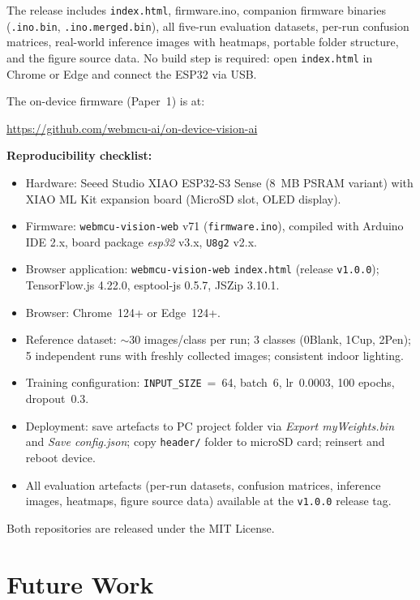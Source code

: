 \documentclass[11pt]{article}
\begin{document}
The release includes \texttt{index.html}, firmware.ino, companion firmware binaries
(\texttt{.ino.bin}, \texttt{.ino.merged.bin}), all five-run evaluation datasets,
per-run confusion matrices, real-world inference images with heatmaps, portable folder structure, and the
figure source data. No build step is required: open \texttt{index.html} in Chrome
or Edge and connect the ESP32 via USB.

The on-device firmware (Paper~1) is at:
\begin{center}
\url{https://github.com/webmcu-ai/on-device-vision-ai}
\end{center}

\textbf{Reproducibility checklist:}
\begin{itemize}
  \item Hardware: Seeed Studio XIAO ESP32-S3 Sense (8~MB PSRAM variant) with XIAO ML Kit
        expansion board (MicroSD slot, OLED display).
  \item Firmware: \texttt{webmcu-vision-web} v71 (\texttt{firmware.ino}), compiled
        with Arduino IDE 2.x, board package \textit{esp32} v3.x, \texttt{U8g2} v2.x.
  \item Browser application: \texttt{webmcu-vision-web} \texttt{index.html} (release \texttt{v1.0.0});
        TensorFlow.js 4.22.0, esptool-js 0.5.7, JSZip 3.10.1.
  \item Browser: Chrome~124+ or Edge~124+.
  \item Reference dataset: $\sim$30 images/class per run; 3 classes (0Blank, 1Cup, 2Pen);
        5 independent runs with freshly collected images; consistent indoor lighting.
  \item Training configuration: \texttt{INPUT\_SIZE}~=~64, batch~6,
        lr~0.0003, 100 epochs, dropout~0.3.
  \item Deployment: save artefacts to PC project folder via \textit{Export myWeights.bin}
        and \textit{Save config.json}; copy \texttt{header/} folder to microSD card;
        reinsert and reboot device.
  \item All evaluation artefacts (per-run datasets, confusion matrices, inference images,
        heatmaps, figure source data) available at the \texttt{v1.0.0} release tag.
\end{itemize}

Both repositories are released under the MIT License.

\section{Future Work}
\end{document}

